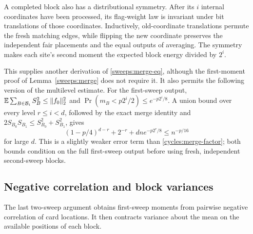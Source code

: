 \begin{remark}
\label{cycles:invariance}
A completed block also has a distributional symmetry. After its $i$
internal coordinates have been processed, its flag-weight law is
invariant under bit translations of those coordinates. Inductively,
old-coordinate translations permute the fresh matching edges, while
flipping the new coordinate preserves the independent fair placements
and the equal outputs of averaging. The symmetry makes each site's
second moment the expected block energy divided by $2^i$.

This supplies another derivation of \eqref{sweeps:merge-eq}, although
the first-moment proof of Lemma~\ref{sweeps:merge} does not require it.
It also permits the following version of the multilevel estimate.
For the first-sweep output,
$\mathbb E\sum_{B\in\mathcal B_i}S_B^2\le\|f_0\|_2^2$ and
$\Pr(m_B<p2^i/2)\le e^{-p2^i/8}$. A union bound over every level
$r\le i<d$, followed by the exact merge identity and
$2S_{B_0}S_{B_1}\le S_{B_0}^2+S_{B_1}^2$, gives
\begin{equation}\label{cycles:invariance-factor}
 (1-p/4)^{d-r}+2^{-r}+dn e^{-p2^r/8}\le n^{-p/16}
\end{equation}
for large $d$. This is a slightly weaker error term than
\eqref{cycles:merge-factor}; both bounds condition on the full
first-sweep output before using fresh, independent second-sweep blocks.
\end{remark}

\subsection{Negative correlation and block variances}
\label{cycles:negative}

The last two-sweep argument obtains first-sweep moments from pairwise
negative correlation of card locations. It then contracts variance
about the mean on the available positions of each block.

